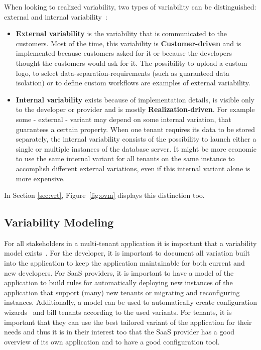 When looking to realized variability, two types of variability can be distinguished: external and internal variability~\cite{mietzner2009variability}:
\begin{itemize}
\item \textbf{External variability} is the variability that is communicated to the customers. Most of the time, this variability is \textbf{Customer-driven} and is implemented because customers asked for it or because the developers thought the customers would ask for it. The possibility to upload a custom logo, to select data-separation-requirements (such as guaranteed data isolation) or to define custom workflows are examples of external variability.
\item \textbf{Internal variability} exists because of implementation details, is visible only to the developer or provider and is mostly \textbf{Realization-driven}. For example some - external - variant may depend on some internal variation, that guarantees a certain property. When one tenant requires its data to be stored separately, the internal variability consists of the possibility to launch either a single or multiple instances of the database server. It might be more economic to use the same internal variant for all tenants on the same instance to accomplish different external variations, even if this internal variant alone is more expensive.
\end{itemize}
In Section \ref{sec:vrt}, Figure~\ref{fig:ovm} displays this distinction too.  

\subsection{Variability Modeling}
For all stakeholders in a multi-tenant application it is important that a variability model exists~\cite{schroeter2012towards}. For the developer, it is important to document all variation built into the application to keep the application maintainable for both current and new developers. 
For SaaS providers, it is important to have a model of the application to build rules for automatically deploying new instances of the application that support (many) new tenants or migrating and reconfiguring instances. 
Additionally, a model can be used to automatically create configuration wizards~\cite{mietzner2008generation} and bill tenants according to the used variants.
For tenants, it is important that they can use the best tailored variant of the application for their needs and thus it is in their interest too that the SaaS provider has a good overview of its own application and to have a good configuration tool.

